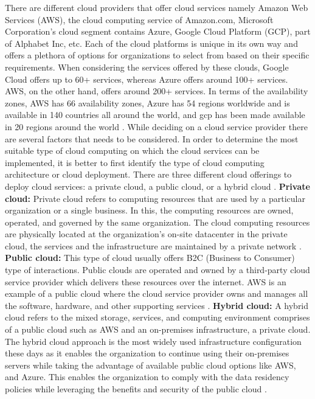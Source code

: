 \par There are different cloud providers that offer cloud services namely Amazon Web Services (AWS), the cloud computing service of Amazon.com, Microsoft Corporation’s cloud segment contains Azure, Google Cloud Platform (GCP), part of Alphabet Inc, etc.
Each of the cloud platforms is unique in its own way and offers a plethora of options for organizations to select from based on their specific requirements.
When considering the services offered by these clouds,
Google Cloud offers up to 60+ services, whereas Azure
offers around 100+ services.
AWS, on the other hand, offers around 200+ services.
In terms of the availability zones, AWS has 66
availability zones, Azure has 54 regions worldwide and is
available in 140 countries all around the world, and
\gls{gcp} has been made available in
20 regions around the world \cite{13}.
While deciding on a cloud service provider there are
several factors that needs to be considered.
In order to determine the most suitable type of cloud computing on which the cloud services can be implemented, it is better to first identify the type of cloud computing architecture or cloud deployment.
There are three different cloud offerings to deploy cloud services: a private cloud, a public cloud, or a hybrid cloud \cite{14}.
\hfill \break
\textbf{Private cloud:}
Private cloud refers to computing resources that are used by a particular organization or a single business.
In this,
the computing resources are owned, operated, and governed by the same organization.
The cloud
computing resources are physically located at the
organization’s on-site datacenter in the private cloud, the
services
and
the
infrastructure are maintained by a private network \cite{14}.
\hfill \break
\textbf{Public cloud:}
This type of cloud usually offers B2C (Business to Consumer) type of interactions. Public clouds are operated and
owned by a third-party cloud service provider which delivers these resources over the internet. AWS is an example of
a public cloud where the cloud service provider owns and manages all the software, hardware, and other supporting
services \cite{14}.
\hfill \break
\textbf{Hybrid cloud:}
A hybrid cloud refers to the mixed storage, services, and computing environment comprises of a public cloud such as
AWS and an on-premises infrastructure, a private cloud. The hybrid cloud approach is the most widely used infrastructure configuration these days as it enables the organization
to continue using their on-premises servers while taking the advantage of available public cloud options like AWS,
and Azure. This enables the organization to comply with the data residency policies while leveraging the benefits and
security of the public cloud \cite{14}.


